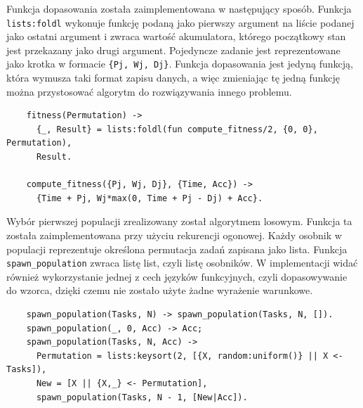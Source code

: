   Funkcja dopasowania została zaimplementowana w następujący sposób.
  Funkcja \texttt{lists:foldl} wykonuje funkcję podaną jako pierwszy argument na
  liście podanej jako ostatni argument i zwraca wartość akumulatora, którego
  początkowy stan jest przekazany jako drugi argument. Pojedyncze zadanie jest
  reprezentowane jako krotka w formacie \texttt{\{Pj, Wj, Dj\}}. Funkcja
  dopasowania jest jedyną funkcją, która wymusza taki format zapisu danych, a
  więc zmieniając tę jedną funkcję można przystosować algorytm do rozwiązywania
  innego problemu.
  \singlespacing
  \begin{center}
  \begin{verbatim}
    fitness(Permutation) ->
      {_, Result} = lists:foldl(fun compute_fitness/2, {0, 0}, Permutation),
      Result.

    compute_fitness({Pj, Wj, Dj}, {Time, Acc}) ->
      {Time + Pj, Wj*max(0, Time + Pj - Dj) + Acc}.
  \end{verbatim}
  \end{center}
  \onehalfspacing
  \vspace{1em}

  Wybór pierwszej populacji zrealizowany został algorytmem losowym. Funkcja ta
  została zaimplementowana przy użyciu rekurencji ogonowej. Każdy osobnik w
  populacji reprezentuje określona permutacja zadań zapisana jako lista. Funkcja
  \texttt{spawn\_population} zwraca listę list, czyli listę osobników. W
  implementacji widać również wykorzystanie jednej z cech języków funkcyjnych,
  czyli dopasowywanie do wzorca, dzięki czemu nie zostało użyte żadne wyrażenie
  warunkowe.
  \singlespacing
  \begin{center}
  \begin{verbatim}
    spawn_population(Tasks, N) -> spawn_population(Tasks, N, []).
    spawn_population(_, 0, Acc) -> Acc;
    spawn_population(Tasks, N, Acc) ->
      Permutation = lists:keysort(2, [{X, random:uniform()} || X <- Tasks]),
      New = [X || {X,_} <- Permutation],
      spawn_population(Tasks, N - 1, [New|Acc]).
  \end{verbatim}
  \end{center}
  \onehalfspacing
  \vspace{1em}

